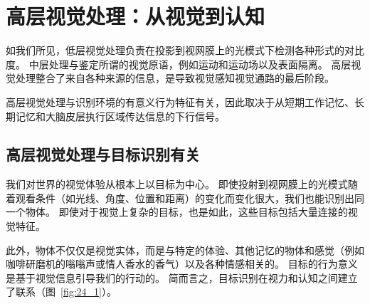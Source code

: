 \chapter{高层视觉处理：从视觉到认知} \label{chap:chap24}

如我们所见，低层视觉处理负责在投影到视网膜上的光模式下检测各种形式的对比度。
中层处理与鉴定所谓的视觉原语，例如运动和运动场以及表面隔离。
高层视觉处理整合了来自各种来源的信息，是导致视觉感知视觉通路的最后阶段。


高层视觉处理与识别环境的有意义行为特征有关，因此取决于从短期工作记忆、长期记忆和大脑皮层执行区域传达信息的下行信号。


\section{高层视觉处理与目标识别有关}

我们对世界的视觉体验从根本上以目标为中心。
即使投射到视网膜上的光模式随着观看条件（如光线、角度、位置和距离）的变化而变化很大，我们也能识别出同一个物体。
即使对于视觉上复杂的目标，也是如此，这些目标包括大量连接的视觉特征。


此外，物体不仅仅是视觉实体，而是与特定的体验、其他记忆的物体和感觉（例如咖啡研磨机的嗡嗡声或情人香水的香气）以及各种情感相关的。
目标的行为意义是基于视觉信息引导我们的行动的。
简而言之，目标识别在视力和认知之间建立了联系（图~\ref{fig:24_1}）。


